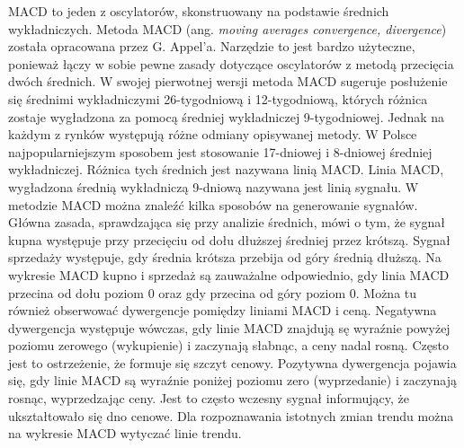\documentclass[pdflatex,11pt]{aghdpl}
\begin{document}
MACD to jeden z oscylatorów, skonstruowany na podstawie średnich wykładniczych. Metoda MACD (ang. \textit{moving averages convergence, divergence}) została opracowana przez G. Appel’a. Narzędzie to jest bardzo użyteczne, ponieważ łączy w sobie pewne zasady dotyczące oscylatorów z metodą przecięcia dwóch średnich. W swojej pierwotnej wersji metoda MACD sugeruje posłużenie się średnimi wykładniczymi 26-tygodniową i 12-tygodniową, których różnica zostaje wygładzona za pomocą średniej wykładniczej 9-tygodniowej. Jednak na każdym z rynków występują różne odmiany opisywanej metody. W Polsce najpopularniejszym sposobem jest stosowanie 17-dniowej i 8-dniowej średniej wykładniczej\cite{1}. Różnica tych średnich jest nazywana linią MACD. Linia MACD, wygładzona średnią wykładniczą 9-dniową nazywana jest linią sygnału. W metodzie MACD można znaleźć kilka sposobów na generowanie sygnałów. Główna zasada, sprawdzająca się przy analizie średnich, mówi o tym, że sygnał kupna występuje przy przecięciu od dołu dłuższej średniej przez krótszą. Sygnał sprzedaży występuje, gdy średnia krótsza przebija od góry średnią dłuższą. Na wykresie MACD kupno i sprzedaż są zauważalne odpowiednio, gdy linia MACD przecina od dołu poziom 0 oraz gdy przecina od góry poziom 0. Można tu również obserwować dywergencje pomiędzy liniami MACD i ceną. Negatywna dywergencja występuje wówczas, gdy linie MACD znajdują sę wyraźnie powyżej poziomu zerowego (wykupienie) i zaczynają słabnąc, a ceny nadal rosną. Często jest to ostrzeżenie, że formuje się szczyt cenowy. Pozytywna dywergencja pojawia się, gdy linie MACD są wyraźnie poniżej poziomu zero (wyprzedanie) i zaczynają rosnąc, wyprzedzając ceny. Jest to często wczesny sygnał informujący, że ukształtowało się dno cenowe. Dla rozpoznawania istotnych zmian trendu można na wykresie MACD wytyczać linie trendu.
\end{document}
